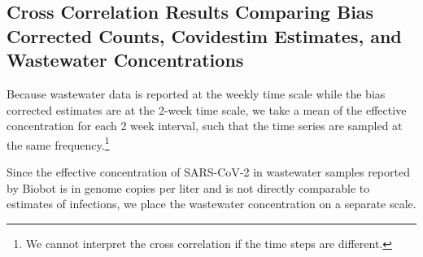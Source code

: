 \documentclass[12pt,twoside]{smiththesis}
\begin{document}
\hypertarget{cross-correlation-results-comparing-bias-corrected-counts-covidestim-estimates-and-wastewater-concentrations}{%
\subsection{Cross Correlation Results Comparing Bias Corrected Counts, Covidestim Estimates, and Wastewater Concentrations}\label{cross-correlation-results-comparing-bias-corrected-counts-covidestim-estimates-and-wastewater-concentrations}}

Because wastewater data is reported at the weekly time scale while the bias corrected estimates are at the 2-week time scale, we take a mean of the effective concentration for each 2 week interval, such that the time series are sampled at the same frequency.\footnote{We cannot interpret the cross correlation if the time steps are different.}

Since the effective concentration of SARS-CoV-2 in wastewater samples reported by Biobot is in genome copies per liter and is not directly comparable to estimates of infections, we place the wastewater concentration on a separate scale.
\end{document}
